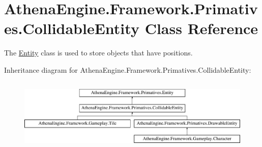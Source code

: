 \hypertarget{class_athena_engine_1_1_framework_1_1_primatives_1_1_collidable_entity}{\section{Athena\-Engine.\-Framework.\-Primatives.\-Collidable\-Entity Class Reference}
\label{class_athena_engine_1_1_framework_1_1_primatives_1_1_collidable_entity}
}


The \hyperlink{class_athena_engine_1_1_framework_1_1_primatives_1_1_entity}{Entity} class is used to store objects that have positions.  


Inheritance diagram for Athena\-Engine.\-Framework.\-Primatives.\-Collidable\-Entity\-:\begin{figure}[H]
\begin{center}
\leavevmode
\includegraphics[height=3.510972cm]{class_athena_engine_1_1_framework_1_1_primatives_1_1_collidable_entity}
\end{center}
\end{figure}
